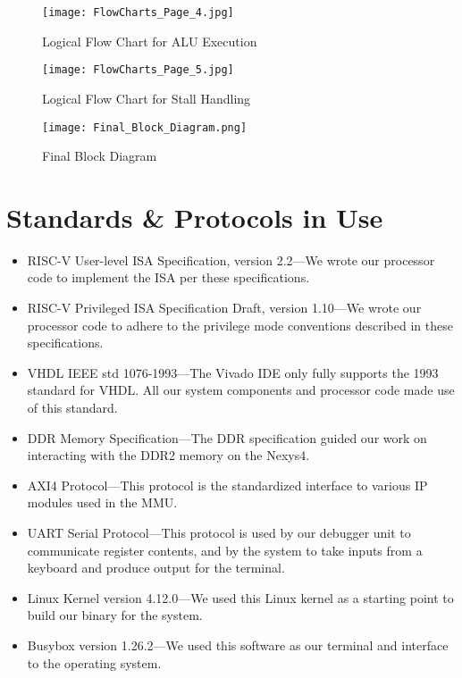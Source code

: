 \documentclass{article}
\begin{document}
\begin{figure}[H]
\caption{Logical Flow Chart for ALU Execution}
\label{flow4}
\centering
\texttt{[image: FlowCharts\_Page\_4.jpg]}
\end{figure}

\begin{figure}[H]
\caption{Logical Flow Chart for Stall Handling}
\label{flow5}
\centering
\texttt{[image: FlowCharts\_Page\_5.jpg]}
\end{figure}

\begin{figure}[H]
\caption{Final Block Diagram}
\label{block}
\centering
\texttt{[image: Final\_Block\_Diagram.png]}
\end{figure}


\section{Standards \& Protocols in Use}

\begin{itemize}
    \item RISC-V User-level ISA Specification, version 2.2---We wrote our processor code to implement the ISA per these specifications.

    \item RISC-V Privileged ISA Specification Draft, version 1.10---We wrote our processor code to adhere to the privilege mode conventions described in these specifications.

    \item VHDL IEEE std 1076-1993---The Vivado IDE only fully supports the 1993 standard for VHDL.  All	our system components and processor code made use of this standard.

    \item DDR Memory Specification---The DDR specification guided our work on interacting with the DDR2 memory on the Nexys4.
	
    \item AXI4 Protocol---This protocol is the standardized interface to various IP modules used in the MMU.
	
    \item UART Serial Protocol---This protocol is used by our debugger unit to communicate register contents, and by the system to take inputs from a keyboard and produce output for the terminal.
	
    \item Linux Kernel version 4.12.0---We used this Linux kernel as a starting point to build our binary for the system.
	
    \item Busybox version 1.26.2---We used this software as our terminal and interface to the operating system.

\end{itemize}
\end{document}
